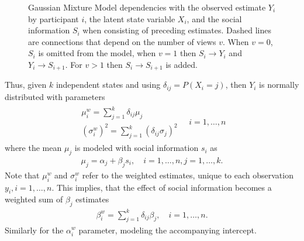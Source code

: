 \documentclass[9pt,a4paper,twocolumn,lineno]{article}
\begin{document}
\begin{figure}[!h]
\centering
{}
	\caption{\tiny Gaussian Mixture Model dependencies with the observed estimate $Y_i$ by participant $i$, the latent state variable $X_i$, and the social information $S_i$ when consisting of preceding estimates. Dashed lines are connections that depend on the number of views $v$. When $v=0$, $S_i$ is omitted from the model, when $v=1$ then $S_i\to Y_i$ and $Y_i\to S_{i+1}$. For $v>1$ then $S_i\to S_{i+1}$ is added.}
\label{fig:model}
\end{figure}

Thus, given $k$ independent states and using $\delta_{ij} = P(X_i=j)$, then $Y_i$ is normally distributed with parameters
\begin{align}
\begin{array}{l}
	\mu^w_i = \sum_{j=1}^k \delta_{ij} \mu_j \\
	(\sigma^w_i)^2 = \sum_{j=1}^k \left(\delta_{ij} \sigma_j\right)^2
\end{array}
\quad i=1,\dots,n \label{eq: weighted Gaussian parameters}
\end{align}
where the mean $\mu_j$ is modeled with social information $s_i$ as
\begin{align}
	\mu_j = \alpha_j+\beta_j s_i, \quad i=1,\dots,n, j=1,\dots,k.
\end{align}
Note that $\mu^w_i$ and $\sigma^w_i$ refer to the weighted estimates, unique to each observation $y_i, i=1, \dots, n$. This implies, that the effect of social information becomes a weighted sum of $\beta_j$ estimates
\begin{align}
	\beta^w_i = \sum_{j=1}^k \delta_{ij} \beta_{j}, \quad i=1,\dots, n. \label{eq: weighted beta}
\end{align}
Similarly for the $\alpha_i^w$ parameter, modeling the accompanying intercept.
\end{document}
